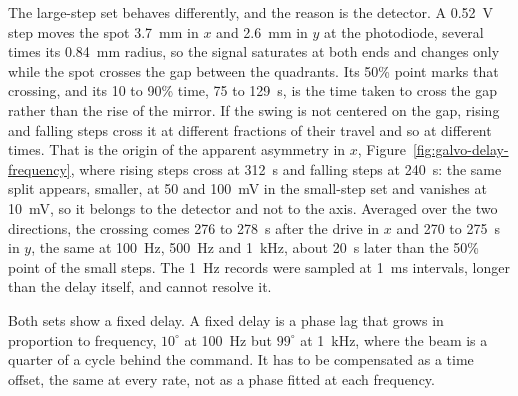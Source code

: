 \documentclass{article}
\begin{document}
The large-step set behaves differently, and the reason is the detector. A 0.52~V step
moves the spot 3.7~mm in $x$ and 2.6~mm in $y$ at the photodiode, several times its 0.84~mm radius,
so the signal saturates at both ends and changes only while the spot crosses the gap between the
quadrants. Its 50\% point marks that crossing, and its 10 to 90\% time, 75 to 129~\textmu s, is the
time taken to cross the gap rather than the rise of the mirror. If the swing is not centered on the
gap, rising and falling steps cross it at different fractions of their travel and so at different
times. That is the origin of the apparent asymmetry in $x$, Figure~\ref{fig:galvo-delay-frequency},
where rising steps cross at 312~\textmu s and falling steps at 240~\textmu s: the same split appears,
smaller, at 50 and 100~mV in the small-step set and vanishes at 10~mV, so it belongs to the detector and
not to the axis. Averaged over the two directions, the crossing comes 276 to 278~\textmu s after the
drive in $x$ and 270 to 275~\textmu s in $y$, the same at 100~Hz, 500~Hz and 1~kHz, about
20~\textmu s later than the 50\% point of the small steps. The 1~Hz records were sampled at 1~ms
intervals, longer than the delay itself, and cannot resolve it.

Both sets show a fixed delay. A fixed delay is a phase lag that grows in proportion to frequency,
$10^\circ$ at 100~Hz but $99^\circ$ at 1~kHz, where the beam is a quarter of a cycle behind the
command. It has to be compensated as a time offset, the same at every rate, not as a phase fitted at
each frequency.
\end{document}
